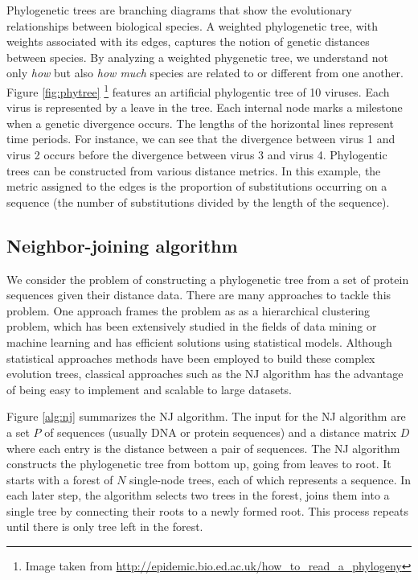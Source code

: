 \documentclass[11pt,letterpaper]{article}
\theoremstyle{definition}
\begin{document}
Phylogenetic trees are branching diagrams that show the evolutionary relationships between biological species. A weighted phylogenetic tree, with weights associated with its edges, captures the notion of genetic distances between species. By analyzing a weighted phygenetic tree, we understand not only \textit{how} but also \textit{how much} species are related to or different from one another. Figure \ref{fig:phytree} \footnote{Image taken from \url{http://epidemic.bio.ed.ac.uk/how_to_read_a_phylogeny}} features an artificial phylogentic tree of 10 viruses. Each virus is represented by a leave in the tree. Each internal node marks a milestone when a genetic divergence occurs. The lengths of the horizontal lines represent time periods. For instance, we can see that the divergence between virus 1 and virus 2 occurs before the divergence between virus 3 and virus 4. Phylogentic trees can be constructed from various distance metrics. In this example, the metric assigned to the edges is the proportion of substitutions occurring on a sequence (the number of substitutions divided by the length of the sequence). 

\subsection{Neighbor-joining algorithm}

We consider the problem of constructing a phylogenetic tree from a set of protein sequences given their distance data. There are many approaches to tackle this problem. One approach frames the problem as as a hierarchical clustering problem, which has been extensively studied in the fields of data mining or machine learning and has efficient solutions using statistical models. Although statistical approaches methods have been employed to build these complex evolution trees, classical approaches such as the NJ algorithm has the advantage of being easy to implement and scalable to large datasets. 

Figure \ref{alg:nj} summarizes the NJ algorithm. The input for the NJ algorithm are a set $P$ of sequences (usually DNA or protein sequences) and a distance matrix $D$ where each entry is the distance between a pair of sequences. The NJ algorithm constructs the phylogenetic tree from bottom up, going from leaves to root. It starts with a forest of $N$ single-node trees, each of which represents a sequence. In each later step, the algorithm selects two trees in the forest, joins them into a single tree by connecting their roots to a newly formed root. This process repeats until there is only tree left in the forest.
\end{document}
